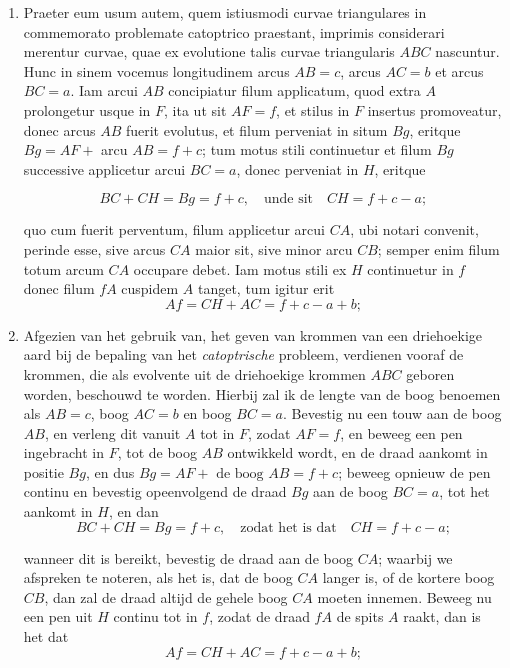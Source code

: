 \documentclass[10pt,a4paper]{article}
\newcommand{\switchenum}{\setcounter{enumi}{\arabic{enumi}-1}\switchcolumn}
\begin{document}
\begin{paracol}{2}
\begin{enumerate}[topsep=1px]
		\switchcolumn*
		
		\item Praeter eum usum autem, quem istiusmodi curvae triangulares in commemorato problemate catoptrico praestant, imprimis considerari merentur curvae, quae ex evolutione talis curvae triangularis $A B C$ nascuntur. Hunc in sinem vocemus longitudinem arcus $A B = c$, arcus $AC=b$ et arcus $BC=a$. Iam arcui $AB$ concipiatur filum applicatum, quod extra $A$ prolongetur usque in $F$, ita ut sit $AF=f$, et stilus in $F$ insertus promoveatur, donec arcus $AB$ fuerit evolutus, et filum perveniat in situm $Bg$, eritque $Bg = AF +$ arcu $AB = f+c$; tum motus stili continuetur et filum $Bg$ successive applicetur arcui $BC=a$, donec perveniat in $H$, eritque 
		
		\[
			BC+CH = Bg = f+c, \quad \text{unde sit} \quad CH = f+c-a;
		\]
		\par quo cum fuerit perventum, filum applicetur arcui $CA$, ubi notari convenit, perinde esse, sive arcus $CA$ maior sit, sive minor arcu $CB$; semper enim filum totum arcum $CA$ occupare debet. Iam motus stili ex $H$ continuetur in $f$ donec filum $fA$ cuspidem $A$ tanget, tum igitur erit 
		\[
			Af = CH + AC = f+c-a+b;
		\]
			
		\switchenum
		\item Afgezien van het gebruik van, het geven van krommen van een driehoekige aard bij de bepaling van het \textit{catoptrische} probleem, verdienen vooraf de krommen, die als evolvente uit de driehoekige krommen $ABC$ geboren worden, beschouwd te worden. Hierbij zal ik de lengte van de boog benoemen als $AB = c$, boog $AC=b$ en boog $BC=a$. Bevestig nu een touw aan de boog $AB$, en verleng dit vanuit $A$ tot in $F$, zodat $AF=f$, en beweeg een pen ingebracht in $F$, tot de boog $AB$ ontwikkeld wordt, en de draad aankomt in positie $Bg$, en dus $Bg = AF + \text{ de boog } AB = f+c$; beweeg opnieuw de pen continu en bevestig opeenvolgend de draad $Bg$ aan de boog $BC=a$, tot het aankomt in $H$, en dan
		\[
			BC+CH = Bg = f+c, \quad \text{zodat het is dat} \quad CH = f+c-a;
		\]
		\par wanneer dit is bereikt, bevestig de draad aan de boog $CA$; waarbij we afspreken te noteren, als het is, dat de boog $CA$ langer is, of de kortere boog $CB$, dan zal de draad altijd de gehele boog $CA$ moeten innemen. Beweeg nu een pen uit $H$ continu tot in $f$, zodat de draad $fA$ de spits $A$ raakt, dan is het dat  
		\[
			Af = CH + AC = f+c-a+b;
		\]
		

\end{enumerate}
\end{paracol}
\end{document}
